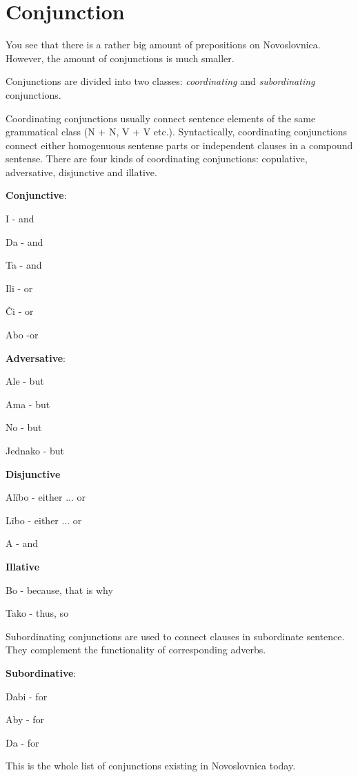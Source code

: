 \section{Conjunction}

You see that there is a rather big amount of prepositions on Novoslovnica. However, the amount of conjunctions is much smaller. 

Conjunctions are divided into two classes: \textit{coordinating} and \textit{subordinating} conjunctions.

Coordinating conjunctions usually connect sentence elements of the same grammatical class (N + N, V + V etc.). Syntactically, coordinating conjunctions connect either homogenuous sentense parts or independent clauses in a compound sentense. There are four kinds of coordinating conjunctions: copulative, adversative, disjunctive and illative.

\textbf{Conjunctive}:

I - and

Da - and

Ta - and

Ili - or

Či - or

Abo -or

\textbf{Adversative}:

Ale - but

Ama - but

No - but

Jednako - but

\textbf{Disjunctive}

Alïbo - either ... or

Lïbo - either ... or

A - and

\textbf{Illative}

Bo - because, that is why

Tako - thus, so

Subordinating conjunctions are used to connect clauses in subordinate sentence. They complement the functionality of corresponding adverbs.

\textbf{Subordinative}:

Dabi - for

Aby - for

Da - for

This is the whole list of conjunctions existing in Novoslovnica today.
